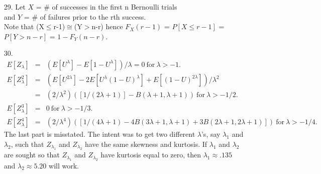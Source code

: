 \begin{enumerate}
	\item[29.] Let $X$ = \# of successes in the first n Bernoulli trials \\
	and $Y$ = \# of failures prior to the rth success. \\
	Note that (X$\le$r-1)$\cong$(Y$>$n-r) hence $F_X(r-1)$ = $P[X\le r-1]$ = $P[Y> n-r]$  = $1 - F_Y(n-r)$.
	
	\item[30.]${}$\vspace{-7.5ex}\begin{eqnarray*}
	E[Z_\lambda] &=& (E[U^\lambda]-E[1-U^\lambda])/\lambda = 0\ \text{for}\ \lambda >-1. \\
	E[Z_\lambda^2] &=& (E[U^{2\lambda}] -2E[U^\lambda(1-U)^\lambda] + E[(1-U)^{2\lambda}])/\lambda^2 \\
	&=& (2/\lambda^2)([1/(2\lambda+1)] - B(\lambda+1,\lambda+1))\ \text{for}\ \lambda > -1/2. \\
	E[Z_\lambda^3] &=& 0\ \text{for}\ \lambda > -1/3. \\
	E[Z_\lambda^4] &=&(2/\lambda^4)([1/(4\lambda+1) - 4B(3\lambda+1,\lambda+1) + 3B(2\lambda+1,2\lambda+1)])\ \text{for}\ \lambda > -1/4.
	\end{eqnarray*}	
	The last part is misstated.  The intent was to get two different $\lambda$'s, say $\lambda_1$ and $\lambda_2$, such that $Z_{\lambda_1}$ and $Z_{\lambda_2}$ have the same skewness and kurtosis.  If $\lambda_1$ and $\lambda_2$ are sought so that $Z_{\lambda_1}$ and $Z_{\lambda_2}$ have kurtosis equal to zero, then $\lambda_1\approx .135$ and $\lambda_2\approx 5.20$ will work. 
	
\end{enumerate}

